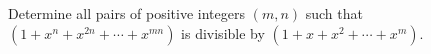 Determine all pairs of positive integers $ (m,n)$ such that$ (1+x^n+x^{2n}+\cdots+x^{mn})$ is divisible by $ (1+x+x^2+\cdots+x^{m})$.